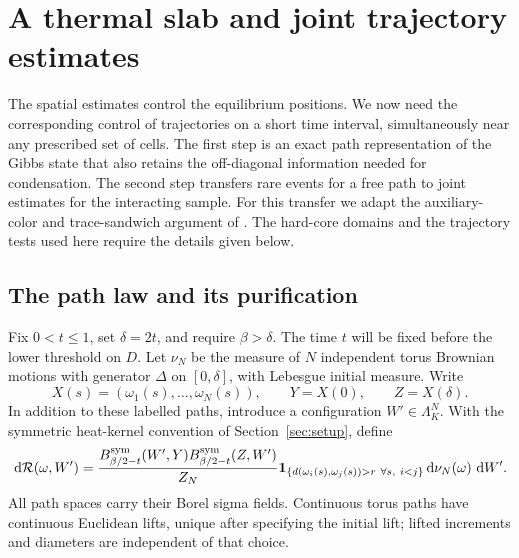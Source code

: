 \section{A thermal slab and joint trajectory estimates}\label{sec:slab}

The spatial estimates control the equilibrium positions.  We now need
the corresponding control of trajectories on a short time interval,
simultaneously near any prescribed set of cells.  The first step is an
exact path representation of the Gibbs state that also retains the
off-diagonal information needed for condensation.  The second step
transfers rare events for a free path to joint estimates for the
interacting sample.  For this transfer we adapt the auxiliary-color
and trace-sandwich argument of \citet[Section ``A joint bound for
atypical trajectories,'' in particular the lemma ``Trace bound for a
Lipschitz sandwich'']{B}.  The hard-core domains and the trajectory
tests used here require the details given below.

\subsection{The path law and its purification}

Fix $0<t\le1$, set $\delta=2t$, and require $\beta>\delta$.
The time $t$ will be fixed before the lower threshold on $D$.
Let $\nu_N$ be the measure of $N$ independent torus Brownian motions
with generator $\Delta$ on $[0,\delta]$, with Lebesgue initial
measure.  Write
\[
 X(s)=(\omega_1(s),\ldots,\omega_N(s)),\qquad
 Y=X(0),\qquad Z=X(\delta).
\]
In addition to these labelled paths, introduce a configuration
$W'\in\Lambda_K^N$.  With the symmetric heat-kernel convention of
Section~\ref{sec:setup}, define
\begin{equation}\label{eq:thermal-slab-law}
 \,\mathrm d\mathcal R(\omega,W')=
 \frac{B_{\beta/2-t}^{\rm sym}(W',Y)
       B_{\beta/2-t}^{\rm sym}(Z,W')}{Z_N}
 \mathbf 1_{\{d(\omega_i(s),\omega_j(s))>r\ \forall s,\ i<j\}}
 \,\mathrm d\nu_N(\omega)\,\,\mathrm d W'.
\end{equation}
All path spaces carry their Borel sigma fields.  Continuous torus
paths have continuous Euclidean lifts, unique after specifying the
initial lift; lifted increments and diameters are independent of that
choice.

